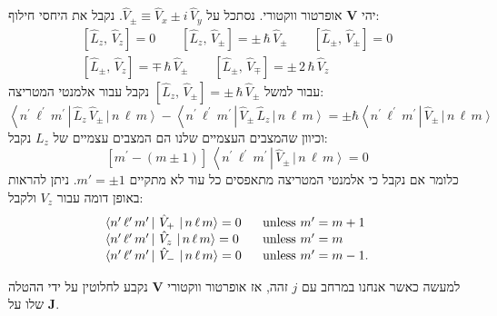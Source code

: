 \documentclass{tstextbook}
\begin{document}
\begin{example}
יהי \(\mathbf{V}\) אופרטור ווקטורי. נסתכל על \(\hat{V}_{\pm}\equiv\hat{V}_{x}\pm i\,\hat{V}_{y}\). נקבל את היחסי חילוף:
\begin{gather*}{{\left[\hat{L}_{z},\,\hat{V}_{z}\right]=0}}\qquad {{\left[\hat{L}_{z},\,\hat{V}_{\pm}\right]=\pm\,\hbar\,\hat{V}_{\pm}}} \qquad {{\left[\hat{L}_{\pm},\,\hat{V}_{\pm}\right]=0}}\\ {{\left[\hat{L}_{\pm},\,\hat{V}_{z}\right]=\mp\,\hbar\,\hat{V}_{\pm}}}\qquad {{\left[\hat{L}_{\pm},\,\hat{V}_{\mp}\right]=\pm\,2\,\hbar\,\hat{V}_{z}}} 
\end{gather*}
עבור למשל \(\left[\hat{L}_{z},\,\hat{V}_{\pm}\right]=\pm\,\hbar\,\hat{V}_{\pm}\) נקבל עבור אלמנטי המטריצה:
$$\left\langle n^{\prime}\,\ell^{\prime}\,m^{\prime}\,\right|\,\hat{L}_{z}\,\hat{V}_{\pm}\,\left|\,n\,\ell\,m\right\rangle-\left\langle n^{\prime}\,\ell^{\prime}\,m^{\prime}\,\right|\,\hat{V}_{\pm}\,\hat{L}_{z}\,\left|\,n\,\ell\,m\right\rangle=\pm\hbar\left\langle n^{\prime}\,\ell^{\prime}\,m^{\prime}\,\right|\,\hat{V}_{\pm}\,\left|\,n\,\ell\,m\right\rangle$$
וכיוון שהמצבים העצמיים שלנו הם המצבים עצמיים של \(L_{z}\) נקבל:
$$\left[m^{\prime}-(m\pm1)\right]\,\left\langle n^{\prime}\,\ell^{\prime}\,m^{\prime}\,\right|\,\hat{V}_{\pm}\,\left|\,n\,\ell\,m\right\rangle=0$$
כלומר אם נקבל כי אלמנטי המטריצה מתאפסים כל עוד לא מתקיים \(m'=\pm 1\). ניתן להראות באופן דומה עבור \(V_{z}\) ולקבל:
$$\begin{array}{l l}{{\left<n^{\prime}\,\ell^{\prime}\,m^{\prime}\,\right|\,\hat{V}_{+}\,\left|\,n\,\ell\,m\right>=0}}&{{\ \ \mathrm{unless~}m^{\prime}=m+1}}\\ {{\left<n^{\prime}\,\ell^{\prime}\,m^{\prime}\,\right|\,\hat{V}_{z}\,\left|\,n\,\ell\,m\right>=0}}&{{\ \ \mathrm{unless~}m^{\prime}=m}}\\ {{\left<n^{\prime}\,\ell^{\prime}\,m^{\prime}\,\right|\,\hat{V}_{-}\,\left|\,n\,\ell\,m\right>=0}}&{{\ \ \mathrm{unless~}m^{\prime}=m-1.}}\end{array}$$

\end{example}
\begin{remark}
למעשה כאשר אנחנו במרחב עם \(j\) זהה, אז אופרטור ווקטורי \(\mathbf{V}\) נקבע לחלוטין על ידי ההטלה שלו על \(\mathbf{J}\).

\end{remark}
\end{document}
